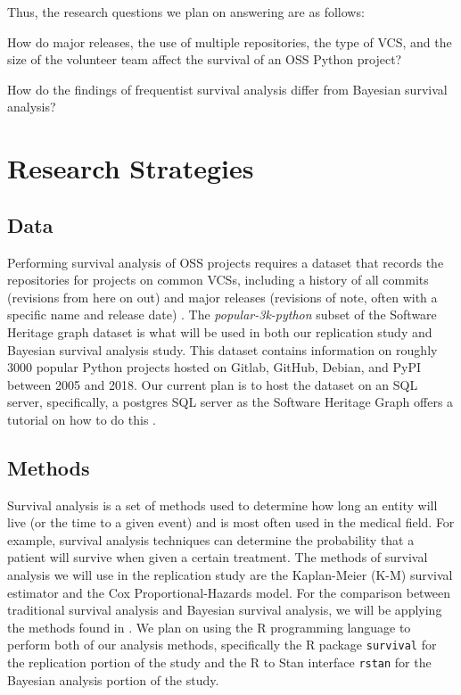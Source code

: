 \documentclass[conference]{IEEEtran}
\begin{document}
Thus, the research questions we plan on answering are as follows:

\begin{questions}
    \item How do major releases, the use of multiple repositories, the type of VCS, and the size of the volunteer team affect the survival of an OSS Python project?
    \item How do the findings of frequentist survival analysis differ from Bayesian survival analysis?
\end{questions}

\section{Research Strategies}

\subsection{Data}

Performing survival analysis of OSS projects requires a dataset that records the repositories for projects on common VCSs, including a history of all commits (revisions from here on out) and major releases (revisions of note, often with a specific name and release date) \cite{ali2020cheating}. The \emph{popular-3k-python} subset of the Software Heritage graph dataset \cite{pietri2019software} is what will be used in both our replication study and Bayesian survival analysis study. This dataset contains information on roughly 3000 popular Python projects hosted on Gitlab, GitHub, Debian, and PyPI between 2005 and 2018. Our current plan is to host the dataset on an SQL server, specifically, a postgres SQL server as the Software Heritage Graph offers a tutorial on how to do this \cite{SQLdataset}.
 
\subsection{Methods}

Survival analysis is a set of methods used to determine how long an entity will live (or the time to a given event) and is most often used in the medical field. For example, survival analysis techniques can determine the probability that a patient will survive when given a certain treatment. The methods of survival analysis we will use in the replication study are the Kaplan-Meier (K-M) survival estimator and the Cox Proportional-Hazards model. For the comparison between traditional survival analysis and Bayesian survival analysis, we will be applying the methods found in \cite{kelter2020bayesian}. We plan on using the R programming language to perform both of our analysis methods, specifically the R package \texttt{survival} for the replication portion of the study and the R to Stan interface \texttt{rstan} for the Bayesian analysis portion of the study.
\end{document}
